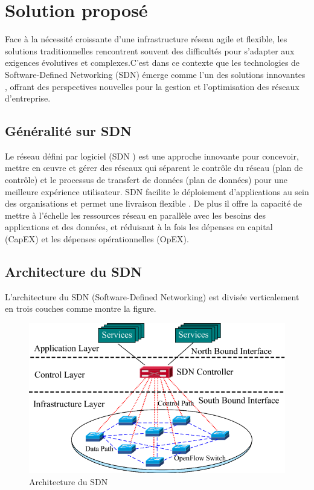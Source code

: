 \section{Solution proposé }

Face à la nécessité croissante d'une infrastructure réseau agile et flexible, les solutions traditionnelles rencontrent souvent des difficultés pour s'adapter aux exigences évolutives et complexes.C'est dans ce contexte que les technologies de Software-Defined Networking (SDN) émerge comme l’un des solutions innovantes , offrant des perspectives nouvelles pour la gestion et l'optimisation des réseaux d'entreprise.

\subsection{Généralité sur SDN }

Le réseau défini par logiciel (SDN ) est une approche innovante pour concevoir, mettre en œuvre et gérer des réseaux qui séparent le contrôle du réseau (plan de contrôle) et le processus de transfert de données (plan de données) pour une meilleure expérience utilisateur.
SDN facilite le déploiement d'applications au sein des organisations et permet une livraison flexible . De plus il offre la capacité de mettre à l'échelle les ressources réseau en parallèle avec les besoins des applications et des données, et réduisant à la fois les dépenses en capital (CapEX) et les dépenses opérationnelles (OpEX). 
\subsection{Architecture du SDN   }
L'architecture du SDN (Software-Defined Networking) est divisée verticalement en trois couches comme montre la figure.

\begin{figure} [H]
	  \hspace{0.9cm}
	\begin{center}
        \centering
		\hspace*{-0.5cm}
		\includegraphics[width=0.67\linewidth]{Images/SDN-arch}
	\end{center}
	\caption{Architecture du SDN}
\end{figure} 

